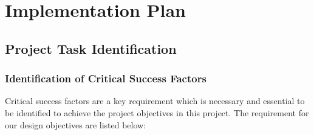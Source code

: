 \chapter{Implementation Plan} 

\label{Chapter5} 


\doublespacing


\section{Project Task Identification}

\subsection{Identification of Critical Success Factors}

Critical success factors are a key requirement which is necessary and essential to be identified to achieve the project objectives in this project. The requirement for our design objectives are listed below: 


